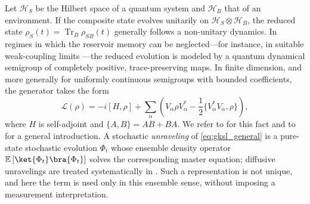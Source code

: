 \documentclass[a4paper,10pt]{amsart}
\newcommand{\HH}{\mathcal{H}}
\DeclareMathOperator{\trace}{Tr}
\newcommand{\expt}[1]{\mathbb{E}\left[#1\right]}
\theoremstyle{remark}
\numberwithin{equation}{section}
\begin{document}
Let $\HH_S$ be the Hilbert space of a quantum system and $\HH_B$ that of an environment. If the composite state evolves unitarily on $\HH_S\otimes\HH_B$, the reduced state $\rho_S(t)=\trace_B\rho_{SB}(t)$ generally follows a non-unitary dynamics. In regimes in which the reservoir memory can be neglected---for instance, in suitable weak-coupling limits \cite{davies1974markovian}---the reduced evolution is modeled by a quantum dynamical semigroup of completely positive, trace-preserving maps. In finite dimension, and more generally for uniformly continuous semigroups with bounded coefficients, the generator takes the form
\begin{equation}\label{eq:gksl_general}
    \mathcal{L}(\rho)
    =-i[H,\rho]
    +\sum_{\alpha}\left(
        V_{\alpha}\rho V_{\alpha}^*
        -\frac12\{V_{\alpha}^*V_{\alpha},\rho\}
    \right),
\end{equation}
where $H$ is self-adjoint and $\{A,B\}=AB+BA$. We refer to  \cite{gorini1976completely,lindblad1976generators} for this fact and to \cite{breuer2002theory} for a general introduction. A stochastic \emph{unraveling} of \eqref{eq:gksl_general} is a pure-state stochastic evolution $\Phi_t$ whose ensemble density operator $\expt{\ket{\Phi_t}\bra{\Phi_t}}$ solves the corresponding master equation; diffusive unravelings are treated systematically in \cite{barchielli2009quantum}. Such a representation is not unique, and here the term is used only in this ensemble sense, without imposing a measurement interpretation.
\end{document}

